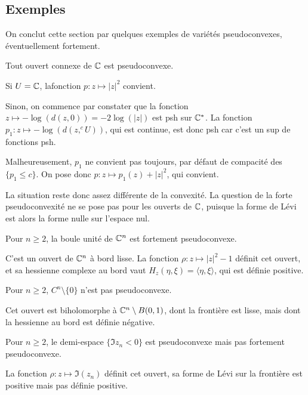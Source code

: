 \subsection{Exemples}
On conclut cette section par quelques exemples de variétés pseudoconvexes, éventuellement fortement.
\begin{exemple}
  Tout ouvert connexe de $\mathbb{C}$ est pseudoconvexe.
\end{exemple}
\begin{preuve}
Si $U=\mathbb{C}$, lafonction $p: z \mapsto |z|^2$ convient.

Sinon, on commence par constater que la fonction $z \mapsto -\log(d(z,0))= -2\log(|z|)$ est psh sur $\mathbb{C}^*$. La fonction $p_1 : z \mapsto -\log(d(z,^cU))$, qui est continue, est donc psh car c'est un sup de fonctions psh.

Malheureusement, $p_1$ ne convient pas toujours, par défaut de compacité des $\{p_1 \leq c\}$. On pose donc $p: z \mapsto p_1(z)+|z|^2$, qui convient.
\end{preuve}
La situation reste donc assez différente de la convexité. La question de la forte pseudoconvexité ne se pose pas pour les ouverts de $\mathbb{C}$, puisque la forme de Lévi est alors la forme nulle sur l'espace nul.
\begin{exemple}
Pour $n \geq 2$, la boule unité de $\mathbb{C}^n$ est fortement pseudoconvexe.
\end{exemple}
\begin{preuve}
C'est un ouvert de $\mathbb{C}^n$ à bord lisse. La fonction $\rho : z \mapsto |z|^2-1$ définit cet ouvert, et sa hessienne complexe au bord vaut $H_z(\eta,\xi) = \langle \eta,\xi \rangle$, qui est définie positive.
\end{preuve}
\begin{exemple}
Pour $n \geq 2$, $C^n \setminus \{0\}$ n'est pas pseudoconvexe.
\end{exemple}
\begin{preuve}
Cet ouvert est biholomorphe à $\mathbb{C}^n \setminus B(0,1)$, dont la frontière est lisse, mais dont la hessienne au bord est définie négative.
\end{preuve}
\begin{exemple}
Pour $n \geq 2$, le demi-espace $\{\Im z_n <0\}$ est pseudoconvexe mais pas fortement pseudoconvexe.
\end{exemple}
\begin{preuve}
La fonction $\rho: z \mapsto \Im(z_n)$ définit cet ouvert, sa forme de Lévi sur la frontière est positive mais pas définie positive.
\end{preuve}

